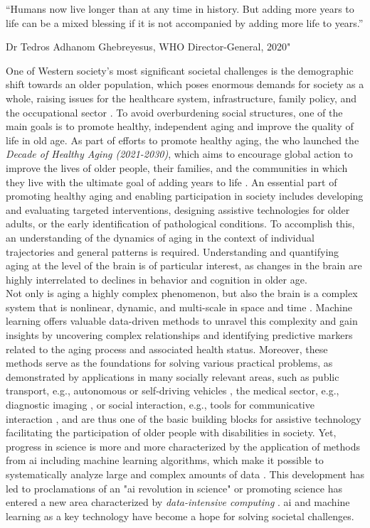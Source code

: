\setlength{\epigraphwidth}{0.6\textwidth}
\epigraph{\centering “Humans now live longer than at any time in history. But adding more years to life can be a mixed blessing if it is not accompanied by adding more life to years.”} {Dr Tedros Adhanom Ghebreyesus, WHO Director-General, 2020"}

One of Western society's most significant societal challenges is the demographic shift towards an older population, which poses enormous demands for society as a whole, raising issues for the healthcare system, infrastructure, family policy, and the occupational sector \cite{who_aging2023}. To avoid overburdening social structures, one of the main goals is to promote healthy, independent aging and improve the quality of life in old age. As part of efforts to promote healthy aging, the \gls{who} launched the \textit{Decade of Healthy Aging (2021-2030)}, which aims to encourage global action to improve the lives of older people, their families, and the communities in which they live with the ultimate goal of adding years to life \cite{who_aging2023}. An essential part of promoting healthy aging and enabling participation in society includes developing and evaluating targeted interventions, designing assistive technologies for older adults, or the early identification of pathological conditions. To accomplish this, an understanding of the dynamics of aging in the context of individual trajectories and general patterns is required. Understanding and quantifying aging at the level of the brain is of particular interest, as changes in the brain are highly interrelated to declines in behavior and cognition in older age.\\
Not only is aging a highly complex phenomenon, but also the brain is a complex system that is nonlinear, dynamic, and multi-scale in space and time \cite{Betzel2017}. Machine learning offers valuable data-driven methods to unravel this complexity and gain insights by uncovering complex relationships and identifying predictive markers related to the aging process and associated health status. Moreover, these methods serve as the foundations for solving various practical problems, as demonstrated by applications in many socially relevant areas, such as public transport, e.g., autonomous or self-driving vehicles \cite{Leonard2020}, the medical sector, e.g., diagnostic imaging \cite{Liu2020}, or social interaction, e.g., tools for communicative interaction \cite{Adamopoulou2020}, and are thus one of the basic building blocks for assistive technology facilitating the participation of older people with disabilities in society. Yet, progress in science is more and more characterized by the application of methods from \gls{ai} including machine learning algorithms, which make it possible to systematically analyze large and complex amounts of data \cite{Brunton2019}. This development has led to proclamations of an "\gls{ai} revolution in science" \cite{Appenzeller2017} or promoting science has entered a new area characterized by \textit{data-intensive computing} \cite{Hey2009}. \Gls{ai} and machine learning as a key technology have become a hope for solving societal challenges.\\ 
